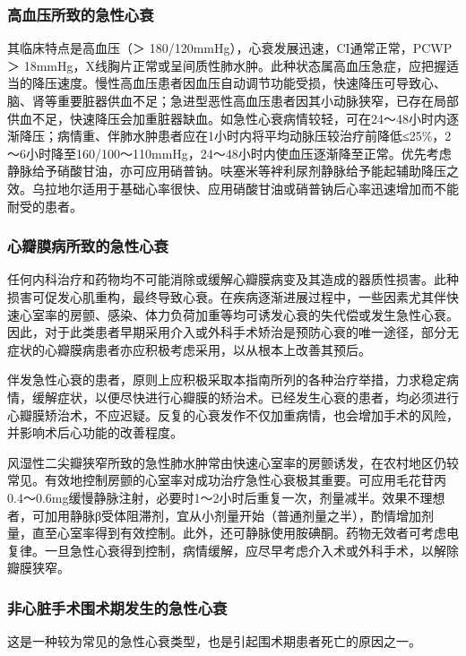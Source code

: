 \subsubsection{高血压所致的急性心衰}

其临床特点是高血压（＞ 180/120mmHg），心衰发展迅速，CI通常正常，PCWP ＞
18mmHg，X线胸片正常或呈间质性肺水肿。此种状态属高血压急症，应把握适当的降压速度。慢性高血压患者因血压自动调节功能受损，快速降压可导致心、脑、肾等重要脏器供血不足；急进型恶性高血压患者因其小动脉狭窄，已存在局部供血不足，快速降压会加重脏器缺血。如急性心衰病情较轻，可在24～48小时内逐渐降压；病情重、伴肺水肿患者应在1小时内将平均动脉压较治疗前降低≤25\%，2～6小时降至160/100～110mmHg，24～48小时内使血压逐渐降至正常。优先考虑静脉给予硝酸甘油，亦可应用硝普钠。呋塞米等袢利尿剂静脉给予能起辅助降压之效。乌拉地尔适用于基础心率很快、应用硝酸甘油或硝普钠后心率迅速增加而不能耐受的患者。

\subsubsection{心瓣膜病所致的急性心衰}

任何内科治疗和药物均不可能消除或缓解心瓣膜病变及其造成的器质性损害。此种损害可促发心肌重构，最终导致心衰。在疾病逐渐进展过程中，一些因素尤其伴快速心室率的房颤、感染、体力负荷加重等均可诱发心衰的失代偿或发生急性心衰。因此，对于此类患者早期采用介入或外科手术矫治是预防心衰的唯一途径，部分无症状的心瓣膜病患者亦应积极考虑采用，以从根本上改善其预后。

伴发急性心衰的患者，原则上应积极采取本指南所列的各种治疗举措，力求稳定病情，缓解症状，以便尽快进行心瓣膜的矫治术。已经发生心衰的患者，均必须进行心瓣膜矫治术，不应迟疑。反复的心衰发作不仅加重病情，也会增加手术的风险，并影响术后心功能的改善程度。

风湿性二尖瓣狭窄所致的急性肺水肿常由快速心室率的房颤诱发，在农村地区仍较常见。有效地控制房颤的心室率对成功治疗急性心衰极其重要。可应用毛花苷丙0.4～0.6mg缓慢静脉注射，必要时1～2小时后重复一次，剂量减半。效果不理想者，可加用静脉β受体阻滞剂，宜从小剂量开始（普通剂量之半），酌情增加剂量，直至心室率得到有效控制。此外，还可静脉使用胺碘酮。药物无效者可考虑电复律。一旦急性心衰得到控制，病情缓解，应尽早考虑介入术或外科手术，以解除瓣膜狭窄。

\subsubsection{非心脏手术围术期发生的急性心衰}

这是一种较为常见的急性心衰类型，也是引起围术期患者死亡的原因之一。

